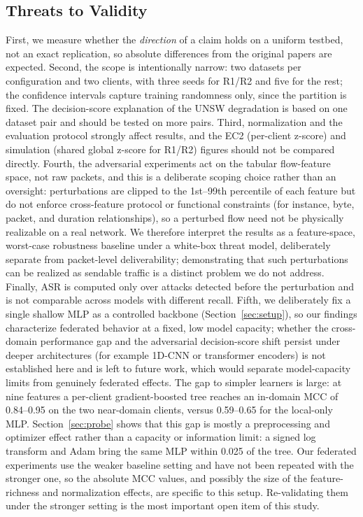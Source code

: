 \documentclass[conference,onecolumn]{IEEEtran}
\begin{document}
\subsection{Threats to Validity}
First, we measure whether the \emph{direction} of a claim holds on a uniform testbed, not an exact
replication, so absolute differences from the original papers are expected. Second, the scope is
intentionally narrow: two datasets per configuration and two clients, with three seeds for R1/R2 and
five for the rest; the confidence intervals capture training randomness only, since the partition is
fixed. The decision-score explanation of the UNSW degradation is based on one dataset pair and should
be tested on more pairs. Third, normalization and the evaluation protocol strongly affect results, and
the EC2 (per-client z-score) and simulation (shared global z-score for R1/R2) figures should not be
compared directly. Fourth, the adversarial experiments act on the tabular flow-feature space, not raw
packets, and this is a deliberate scoping choice rather than an oversight: perturbations are clipped
to the 1st--99th percentile of each feature but do not enforce cross-feature protocol or functional
constraints (for instance, byte, packet, and duration relationships), so a perturbed flow need not be
physically realizable on a real network. We therefore interpret the results as a feature-space,
worst-case robustness baseline under a white-box threat model, deliberately separate from
packet-level deliverability; demonstrating that such perturbations can be realized as sendable traffic
is a distinct problem we do not address. Finally, ASR is computed only over attacks detected before
the perturbation and is not comparable across models with different recall.
Fifth, we deliberately fix a single shallow MLP as a controlled backbone (Section~\ref{sec:setup}), so
our findings characterize federated behavior at a fixed, low model capacity; whether the cross-domain
performance gap and the adversarial decision-score shift persist under deeper architectures (for
example 1D-CNN or transformer encoders) is not established here and is left to future work, which
would separate model-capacity limits from genuinely federated effects. The gap to simpler learners is
large: at nine features a per-client gradient-boosted tree reaches an in-domain MCC of 0.84--0.95 on
the two near-domain clients, versus 0.59--0.65 for the local-only MLP. Section~\ref{sec:probe} shows
that this gap is mostly a preprocessing and optimizer effect rather than a capacity or information limit:
a signed log transform and Adam bring the same MLP within 0.025 of the tree. Our federated experiments
use the weaker baseline setting and have not been repeated with the stronger one, so the absolute MCC
values, and possibly the size of the feature-richness and normalization effects, are specific to this
setup. Re-validating them under the stronger setting is the most important open item of this study.
\end{document}
